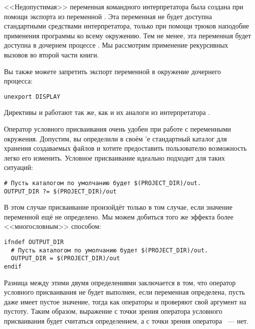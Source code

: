 \begin{description}
<<Недопустимая>> переменная командного интерпретатора была создана при
помощи экспорта из \GNUmake{} переменной
. Эта переменная не будет доступна
стандартными средствами интерпретатора, только при помощи трюков
наподобие применения программы  ко всему окружению. Тем
не менее, эта переменная будет доступна в дочернем процессе
\GNUmake{}. Мы рассмотрим применение рекурсивных вызовов \GNUmake{} во
второй части книги.

Вы также можете запретить экспорт переменной в окружение дочернего
процесса:

{\footnotesize
\begin{verbatim}
unexport DISPLAY
\end{verbatim}
}

 Директивы
 и  работают так же, как и
их аналоги из интерпретатора .

Оператор условного присваивания очень удобен при работе с переменными
окружения. Допустим, вы определили в своём \Makefile{}'е стандартный
каталог для хранения создаваемых файлов и хотите предоставить
пользователю возможность легко его изменить. Условное присваивание
идеально подходит для таких ситуаций:

{\footnotesize
\begin{verbatim}
# Пусть каталогом по умолчанию будет $(PROJECT_DIR)/out.
OUTPUT_DIR ?= $(PROJECT_DIR)/out
\end{verbatim}
}

В этом случае присваивание произойдёт только в том случае, если
значение переменной  ещё не определено. Мы можем
добиться того же эффекта более <<многословным>> способом:

{\footnotesize
\begin{verbatim}
ifndef OUTPUT_DIR
  # Пусть каталогом по умолчанию будет $(PROJECT_DIR)/out.
  OUTPUT_DIR = $(PROJECT_DIR)/out
endif
\end{verbatim}
}

Разница между этими двумя определениями заключается в том, что
оператор условного присваивания не будет выполнен, если переменная
 определена, пусть даже имеет пустое значение,
тогда как операторы  и  проверяют
свой аргумент на пустоту. Таким образом, выражение
 с точки зрения оператора условного присваивания
будет считаться определением, а с точки зрения оператора
~--- нет.


\end{description}

